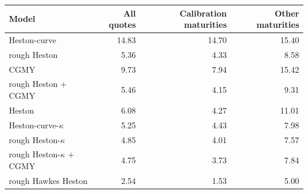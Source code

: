 \begin{tabular}{lrrr}
\toprule
Model & All quotes & Calibration maturities & Other maturities\\
\midrule
Heston-curve & 14.83 & 14.70 & 15.40\\
rough Heston & 5.36 & 4.33 & 8.58\\
CGMY & 9.73 & 7.94 & 15.42\\
rough Heston + CGMY & 5.46 & 4.15 & 9.31\\
\addlinespace
Heston & 6.08 & 4.27 & 11.01\\
Heston-curve-$\kappa$ & 5.25 & 4.43 & 7.98\\
rough Heston-$\kappa$ & 4.85 & 4.01 & 7.57\\
rough Heston-$\kappa$ + CGMY & 4.75 & 3.73 & 7.84\\
rough Hawkes Heston & 2.54 & 1.53 & 5.00\\
\bottomrule
\end{tabular}
